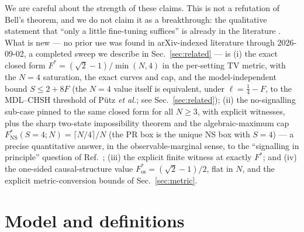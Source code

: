 \documentclass[aps,pra,reprint,superscriptaddress,floatfix]{revtex4-2}
\begin{document}
We are careful about the strength of these claims. This is not a refutation
of Bell's theorem, and we do not claim it as a breakthrough: the qualitative
statement that ``only a little fine-tuning suffices'' is already in the
literature \cite{hall2010,fghk2019,hallbranciard2020}. What is new --- no
prior use was found in arXiv-indexed literature through 2026-09-02, a
completed sweep we describe in Sec.~\ref{sec:related} --- is (i) the exact
closed form $F^*=(\sqrt{2}-1)/\min(N,4)$ in the per-setting TV metric, with
the $N=4$ saturation, the exact curves and cap, and the model-independent
bound $S\le 2+8F$ (the $N=4$ value itself is equivalent, under
$\ell=\tfrac14-F$, to the MDL--CHSH threshold of P\"utz \emph{et al.}; see
Sec.~\ref{sec:related}); (ii) the no-signalling sub-case pinned to the same closed
form for all $N\ge 3$, with explicit witnesses, plus the sharp two-state
impossibility theorem and the algebraic-maximum cap
$F^*_{\mathrm{NS}}(S{=}4;N)=\lceil N/4\rceil/N$ (the PR box is the unique
NS box with $S=4$) --- a precise quantitative answer, in the
observable-marginal sense, to the ``signalling in principle'' question of
Ref.~; (iii) the explicit finite witness at exactly
$F^*$; and (iv) the one-sided causal-structure value
$F^*_{\mathrm{os}}=(\sqrt2-1)/2$, flat in $N$, and the explicit
metric-conversion bounds of Sec.~\ref{sec:metric}.

\section{Model and definitions}
\label{sec:model}
\end{document}
